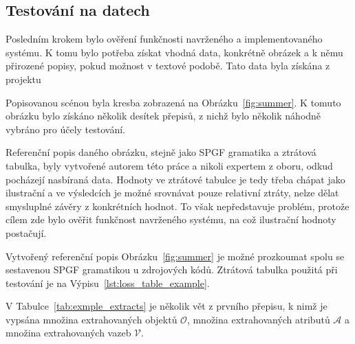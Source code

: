\subsection{Testování na datech}
Posledním krokem bylo ověření funkčnosti navrženého a implementovaného systému.
K tomu bylo potřeba získat vhodná data, konkrétně obrázek a k němu přirozené popisy, pokud možnost v textové podobě.
Tato data byla získána z projektu

Popisovanou scénou byla kresba zobrazená na Obrázku~\ref{fig:summer}.
K tomuto obrázku bylo získáno několik desítek přepisů, z nichž bylo několik náhodně vybráno pro účely testování.

Referenční popis daného obrázku, stejně jako SPGF gramatika a ztrátová tabulka,
byly vytvořené autorem této práce a nikoli expertem z oboru, odkud pocházejí nasbíraná data.
Hodnoty ve ztrátové tabulce je tedy třeba chápat jako ilustrační a ve výsledcích je možné srovnávat pouze relativní ztráty,
nelze dělat smysluplné závěry z konkrétních hodnot.
To však nepředstavuje problém, protože cílem zde bylo ověřit funkčnost navrženého systému, na což ilustrační hodnoty postačují.

Vytvořený referenční popis Obrázku~\ref{fig:summer} je možné prozkoumat spolu se sestavenou SPGF gramatikou u zdrojových kódů.
Ztrátová tabulka použitá při testování je na Výpisu~\ref{lst:loss_table_example}.



V Tabulce~\ref{tab:exmple_extracts} je několik vět z prvního přepisu, k nimž je vypsána množina extrahovaných objektů $\mathcal{O}$,
množina extrahovaných atributů $\mathcal A$ a množina extrahovaných vazeb $\mathcal V$.

